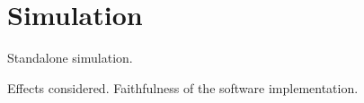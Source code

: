 \section{Simulation}
\label{sec:sim}

Standalone simulation.

Effects considered. Faithfulness of the software implementation.

